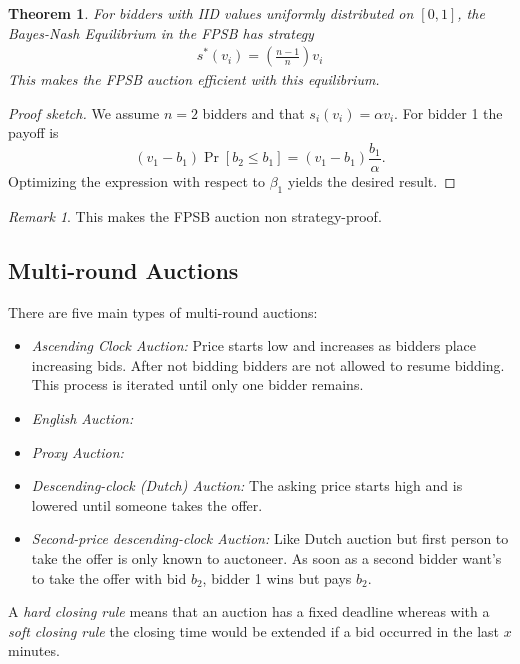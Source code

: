 \documentclass[12pt]{article}
\newtheorem{theorem}{Theorem}
\theoremstyle{definition}
\theoremstyle{remark}
\newtheorem*{remark}{Remark}
\begin{document}
\begin{theorem}
	For bidders with IID values uniformly distributed on $[0,1]$, the Bayes-Nash Equilibrium in the FPSB has strategy
	\begin{align*}
		s^*(v_i) = \left(\frac{n-1}{n}\right)v_i
	\end{align*}
	This makes the FPSB auction efficient with this equilibrium.
\end{theorem}

\begin{proof}[Proof sketch]
We assume $n=2$ bidders and that $s_i(v_i) = \alpha v_i$. For bidder 1 the payoff is $$(v_1 - b_1) \Pr \left[b_2\leq b_1\right] = (v_1 - b_1 ) \frac{b_1}{\alpha}.$$ Optimizing the expression with respect to $\beta_1$ yields the desired result.
\end{proof}

\begin{remark}
	This makes the FPSB auction non strategy-proof.
\end{remark}

\subsection*{Multi-round Auctions}

There are five main types of multi-round auctions:

\begin{itemize}
	\item \textit{Ascending Clock Auction:} Price starts low and increases as bidders place increasing bids. After not bidding bidders are not allowed to resume bidding. This process is iterated until only one bidder remains.
	\item \textit{English Auction:} 
	\item \textit{Proxy Auction:} 
	\item \textit{Descending-clock (Dutch) Auction:} The asking price starts high and is lowered until someone takes the offer.
	\item \textit{Second-price descending-clock Auction:} Like Dutch auction but first person to take the offer is only known to auctoneer. As soon as a second bidder want's to take the offer with bid $b_2$, bidder 1 wins but pays $b_2$.
\end{itemize}

\begin{example}[Ebay]
\end{example}



\begin{definition}
A \textit{hard closing rule} means that an auction has a fixed deadline whereas with a \textit{soft closing rule} the closing time would be extended if a bid occurred in the last $x$ minutes.
\end{definition}
\end{document}
